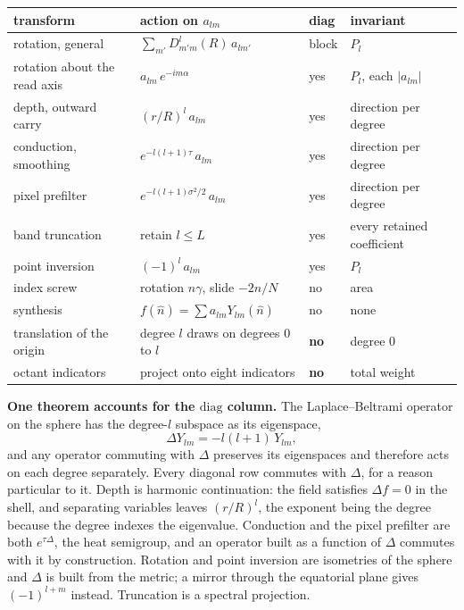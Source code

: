 \begin{center}
\begin{tabular}{llll}
\toprule
transform & action on \(a_{lm}\) & diag & invariant \\
\midrule
rotation, general & \(\sum_{m'} D^{l}_{m'm}(R)\, a_{lm'}\) & block & \(P_l\) \\
rotation about the read axis & \(a_{lm}\, e^{-im\alpha}\) & yes & \(P_l\), each \(|a_{lm}|\) \\
depth, outward carry & \((r/R)^{l}\, a_{lm}\) & yes & direction per degree \\
conduction, smoothing & \(e^{-l(l+1)\tau}\, a_{lm}\) & yes & direction per degree \\
pixel prefilter & \(e^{-l(l+1)\sigma^2/2}\, a_{lm}\) & yes & direction per degree \\
band truncation & retain \(l \le L\) & yes & every retained coefficient \\
point inversion & \((-1)^{l}\, a_{lm}\) & yes & \(P_l\) \\
index screw & rotation \(n\gamma\), slide \(-2n/N\) & no & area \\
synthesis & \(f(\hat n) = \sum a_{lm} Y_{lm}(\hat n)\) & no & none \\
translation of the origin & degree \(l\) draws on degrees \(0\) to \(l\) & \textbf{no} & degree \(0\) \\
octant indicators & project onto eight indicators & \textbf{no} & total weight \\
\bottomrule
\end{tabular}
\end{center}

\textbf{One theorem accounts for the \(\mathrm{diag}\) column.} The Laplace--Beltrami operator on the sphere has the degree-\(l\) subspace as its eigenspace,
\[
  \Delta Y_{lm} = -l(l+1)\, Y_{lm},
\]
and any operator commuting with \(\Delta\) preserves its eigenspaces and therefore acts on each degree separately. Every diagonal row commutes with \(\Delta\), for a reason particular to it. Depth is harmonic continuation: the field satisfies \(\Delta f = 0\) in the shell, and separating variables leaves \((r/R)^l\), the exponent being the degree because the degree indexes the eigenvalue. Conduction and the pixel prefilter are both \(e^{\tau\Delta}\), the heat semigroup, and an operator built as a function of \(\Delta\) commutes with it by construction. Rotation and point inversion are isometries of the sphere and \(\Delta\) is built from the metric; a mirror through the equatorial plane gives \((-1)^{l+m}\) instead. Truncation is a spectral projection.


